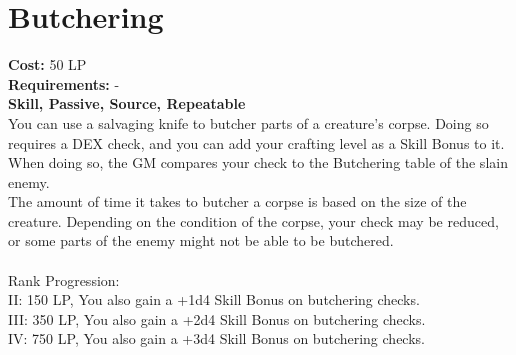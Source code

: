 \section{Butchering}\label{perk:butchering}
\textbf{Cost:} 50 LP\\
\textbf{Requirements:} -\\
\textbf{Skill, Passive, Source, Repeatable}\\
You can use a salvaging knife to butcher parts of a creature's corpse.
Doing so requires a DEX check, and you can add your crafting level as a Skill Bonus to it.
When doing so, the GM compares your check to the Butchering table of the slain enemy.\\
The amount of time it takes to butcher a corpse is based on the size of the creature.
Depending on the condition of the corpse, your check may be reduced, or some parts of the enemy might not be able to be butchered.\\
\\
Rank Progression:\\
II: 150 LP, You also gain a +1d4 Skill Bonus on butchering checks.\\
III: 350 LP, You also gain a +2d4 Skill Bonus on butchering checks.\\
IV: 750 LP, You also gain a +3d4 Skill Bonus on butchering checks.\\